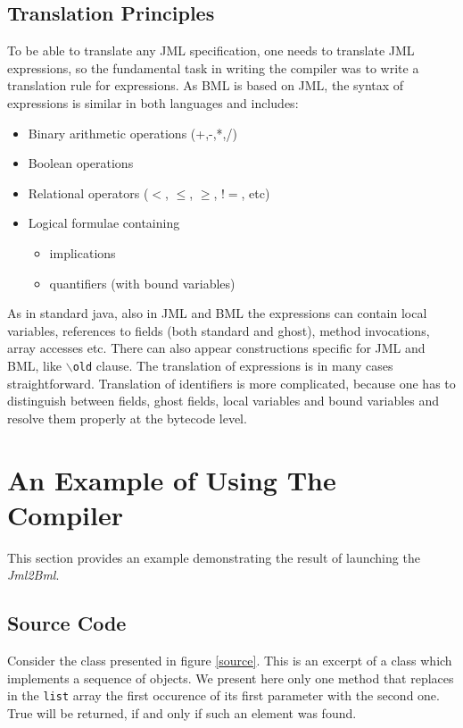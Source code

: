 \documentclass{acm_proc_article-sp}
\begin{document}
\subsection{Translation Principles}
To be able to translate any JML specification, one needs to translate JML expressions, so the fundamental task in writing the compiler was to write a translation rule for expressions. As BML is based on JML, the syntax of expressions is similar in both languages and includes:
\begin{itemize}
\item{Binary arithmetic operations (+,-,*,/)}
\item{Boolean operations}
\item{Relational operators ($<$, $\le$, $\ge$, $!=$, etc)}
\item{Logical formulae containing 
\begin{itemize}
\item implications
\item quantifiers (with bound variables)
\end{itemize}}
\end{itemize}
As in standard java, also in JML and BML the expressions can contain local variables, references to fields (both standard and ghost), method invocations, array accesses etc. There can also appear constructions specific for JML and BML, like \texttt{$\backslash$old} clause. The translation of expressions is in many cases straightforward. Translation of identifiers is more complicated, because one has to distinguish between fields, ghost fields, local variables and bound variables and resolve them properly at the bytecode level.



\section{An Example of Using The\\Compiler}
This section provides an example demonstrating the result of launching the \textit{Jml2Bml}.
\subsection{Source Code}
Consider the class presented in figure \ref{source}. This is an excerpt of a class which implements a sequence of objects. We present here only one method that replaces in the \texttt{list} array the first occurence of its first parameter with the second one. True will be returned, if and only if such an element was found.
\end{document}

